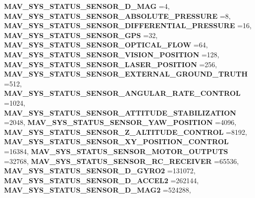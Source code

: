 \begin{DoxyCompactItemize}
\textbf{ M\+A\+V\+\_\+\+S\+Y\+S\+\_\+\+S\+T\+A\+T\+U\+S\+\_\+\+S\+E\+N\+S\+O\+R\+\_\+D\+\_\+\+M\+AG} =4, 
\textbf{ M\+A\+V\+\_\+\+S\+Y\+S\+\_\+\+S\+T\+A\+T\+U\+S\+\_\+\+S\+E\+N\+S\+O\+R\+\_\+\+A\+B\+S\+O\+L\+U\+T\+E\+\_\+\+P\+R\+E\+S\+S\+U\+RE} =8, 
\newline
\textbf{ M\+A\+V\+\_\+\+S\+Y\+S\+\_\+\+S\+T\+A\+T\+U\+S\+\_\+\+S\+E\+N\+S\+O\+R\+\_\+\+D\+I\+F\+F\+E\+R\+E\+N\+T\+I\+A\+L\+\_\+\+P\+R\+E\+S\+S\+U\+RE} =16, 
\textbf{ M\+A\+V\+\_\+\+S\+Y\+S\+\_\+\+S\+T\+A\+T\+U\+S\+\_\+\+S\+E\+N\+S\+O\+R\+\_\+\+G\+PS} =32, 
\textbf{ M\+A\+V\+\_\+\+S\+Y\+S\+\_\+\+S\+T\+A\+T\+U\+S\+\_\+\+S\+E\+N\+S\+O\+R\+\_\+\+O\+P\+T\+I\+C\+A\+L\+\_\+\+F\+L\+OW} =64, 
\textbf{ M\+A\+V\+\_\+\+S\+Y\+S\+\_\+\+S\+T\+A\+T\+U\+S\+\_\+\+S\+E\+N\+S\+O\+R\+\_\+\+V\+I\+S\+I\+O\+N\+\_\+\+P\+O\+S\+I\+T\+I\+ON} =128, 
\newline
\textbf{ M\+A\+V\+\_\+\+S\+Y\+S\+\_\+\+S\+T\+A\+T\+U\+S\+\_\+\+S\+E\+N\+S\+O\+R\+\_\+\+L\+A\+S\+E\+R\+\_\+\+P\+O\+S\+I\+T\+I\+ON} =256, 
\textbf{ M\+A\+V\+\_\+\+S\+Y\+S\+\_\+\+S\+T\+A\+T\+U\+S\+\_\+\+S\+E\+N\+S\+O\+R\+\_\+\+E\+X\+T\+E\+R\+N\+A\+L\+\_\+\+G\+R\+O\+U\+N\+D\+\_\+\+T\+R\+U\+TH} =512, 
\textbf{ M\+A\+V\+\_\+\+S\+Y\+S\+\_\+\+S\+T\+A\+T\+U\+S\+\_\+\+S\+E\+N\+S\+O\+R\+\_\+\+A\+N\+G\+U\+L\+A\+R\+\_\+\+R\+A\+T\+E\+\_\+\+C\+O\+N\+T\+R\+OL} =1024, 
\textbf{ M\+A\+V\+\_\+\+S\+Y\+S\+\_\+\+S\+T\+A\+T\+U\+S\+\_\+\+S\+E\+N\+S\+O\+R\+\_\+\+A\+T\+T\+I\+T\+U\+D\+E\+\_\+\+S\+T\+A\+B\+I\+L\+I\+Z\+A\+T\+I\+ON} =2048, 
\newline
\textbf{ M\+A\+V\+\_\+\+S\+Y\+S\+\_\+\+S\+T\+A\+T\+U\+S\+\_\+\+S\+E\+N\+S\+O\+R\+\_\+\+Y\+A\+W\+\_\+\+P\+O\+S\+I\+T\+I\+ON} =4096, 
\textbf{ M\+A\+V\+\_\+\+S\+Y\+S\+\_\+\+S\+T\+A\+T\+U\+S\+\_\+\+S\+E\+N\+S\+O\+R\+\_\+\+Z\+\_\+\+A\+L\+T\+I\+T\+U\+D\+E\+\_\+\+C\+O\+N\+T\+R\+OL} =8192, 
\textbf{ M\+A\+V\+\_\+\+S\+Y\+S\+\_\+\+S\+T\+A\+T\+U\+S\+\_\+\+S\+E\+N\+S\+O\+R\+\_\+\+X\+Y\+\_\+\+P\+O\+S\+I\+T\+I\+O\+N\+\_\+\+C\+O\+N\+T\+R\+OL} =16384, 
\textbf{ M\+A\+V\+\_\+\+S\+Y\+S\+\_\+\+S\+T\+A\+T\+U\+S\+\_\+\+S\+E\+N\+S\+O\+R\+\_\+\+M\+O\+T\+O\+R\+\_\+\+O\+U\+T\+P\+U\+TS} =32768, 
\newline
\textbf{ M\+A\+V\+\_\+\+S\+Y\+S\+\_\+\+S\+T\+A\+T\+U\+S\+\_\+\+S\+E\+N\+S\+O\+R\+\_\+\+R\+C\+\_\+\+R\+E\+C\+E\+I\+V\+ER} =65536, 
\textbf{ M\+A\+V\+\_\+\+S\+Y\+S\+\_\+\+S\+T\+A\+T\+U\+S\+\_\+\+S\+E\+N\+S\+O\+R\+\_\+D\+\_\+\+G\+Y\+R\+O2} =131072, 
\textbf{ M\+A\+V\+\_\+\+S\+Y\+S\+\_\+\+S\+T\+A\+T\+U\+S\+\_\+\+S\+E\+N\+S\+O\+R\+\_\+D\+\_\+\+A\+C\+C\+E\+L2} =262144, 
\textbf{ M\+A\+V\+\_\+\+S\+Y\+S\+\_\+\+S\+T\+A\+T\+U\+S\+\_\+\+S\+E\+N\+S\+O\+R\+\_\+D\+\_\+\+M\+A\+G2} =524288, 

\end{DoxyCompactItemize}

